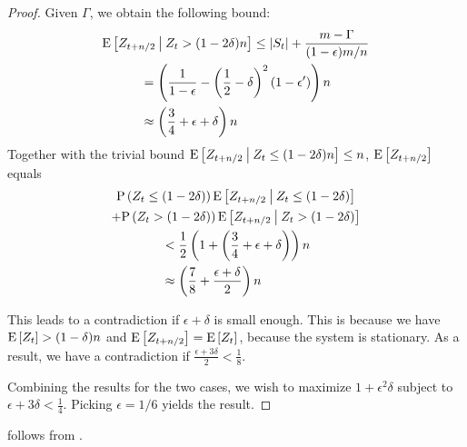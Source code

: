 \begin{proof}
	Given $\Gamma$, we obtain the following bound:
	\begin{multline*}
		\mathrm{E}\left[Z_{t+n/2} \:\middle|\: Z_t > (1-2\delta)n\right] \le |S_t| + \frac{m-\Gamma}{(1-\epsilon)m/n} \\
		\begin{aligned} &= \left(\frac{1}{1-\epsilon} - \left(\frac{1}{2}-\delta\right)^2(1-\epsilon')\right) n \\
		&\approx \left(\frac{3}{4}+\epsilon+\delta\right) n \end{aligned}
	\end{multline*}
	Together with the trivial bound $\mathrm{E}\left[Z_{t+n/2} \:\middle|\: Z_t \le (1-2\delta)n\right]
	\le n$,  $\mathrm{E}\left[Z_{t+n/2}\right]$ equals
	\begin{multline*}
		\mathrm{P}\left(Z_t \le (1-2\delta)\right)\mathrm{E}\left[Z_{t+n/2} \:\middle|\: Z_t \le (1-2\delta)\right] \\
		+ \mathrm{P}\left(Z_t > (1-2\delta)\right)\mathrm{E}\left[Z_{t+n/2} \:\middle|\: Z_t > (1-2\delta)\right] \\
		\begin{aligned} &< \frac{1}{2} \left( 1 + \left(\frac{3}{4}+\epsilon+\delta\right) \right) n\\
		&\approx \left(\frac{7}{8} + \frac{\epsilon+\delta}{2}\right) n \end{aligned}
	\end{multline*}
		
	This leads to a contradiction if $\epsilon+\delta$ is small enough.  This
	is because we have $\mathrm{E}\left[Z_t\right] > (1-\delta)n$ and $\mathrm{E}\left[Z_{t+n/2}\right] = \mathrm{E}\left[Z_t\right]$,
	because the system is stationary.  As a result, we have a contradiction if
	$\frac{\epsilon+3\delta}{2} < \frac{1}{8}$.

	Combining the results for the two cases, we wish to maximize
	$1+\epsilon^2\delta$ subject to $\epsilon+3\delta < \frac{1}{4}.$ Picking
	$\epsilon = 1/6$ yields the result.
\end{proof}

 follows from
.



